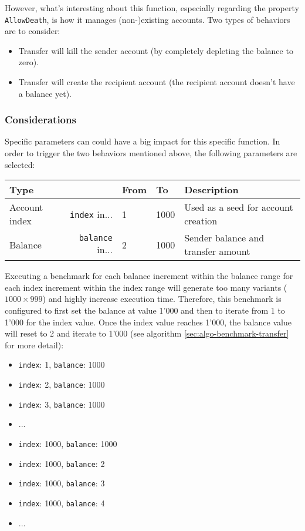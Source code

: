 \documentclass[11pt,a4paper]{article}
\begin{document}
However, what's interesting about this function, especially regarding the
property \verb|AllowDeath|, is how it manages (non-)existing accounts. Two types
of behaviors are to consider:

\begin{itemize}
  \item Transfer will kill the sender account (by completely depleting the
  balance to zero).
  \item Transfer will create the recipient account (the recipient account
  doesn't have a balance yet).
\end{itemize}

\subsubsection*{Considerations}

Specific parameters can could have a big impact for this specific function. In
order to trigger the two behaviors mentioned above, the following parameters are
selected:

\begin{center}
  \begin{tabular}{ l|r l l l }
    \textbf{Type} && \textbf{From} & \textbf{To} & \textbf{Description}\\
    \hline
    Account index & \verb|index| in... & 1 & 1000 & Used as a seed for account
    creation \\
    Balance & \verb|balance| in... & 2 & 1000 & Sender balance and transfer
    amount \\
  \end{tabular}
\end{center}

Executing a benchmark for each balance increment within the balance range for
each index increment within the index range will generate too many variants
($1000 \times 999$) and highly increase execution time. Therefore, this
benchmark is configured to first set the balance at value 1'000 and then to
iterate from 1 to 1'000 for the index value. Once the index value reaches 1'000,
the balance value will reset to 2 and iterate to 1'000 (see algorithm
\ref{sec:algo-benchmark-transfer} for more detail):

\begin{itemize}
  \item \verb|index|: 1, \verb|balance|: 1000
  \item \verb|index|: 2, \verb|balance|: 1000
  \item \verb|index|: 3, \verb|balance|: 1000
  \item ...
  \item \verb|index|: 1000, \verb|balance|: 1000
  \item \verb|index|: 1000, \verb|balance|: 2
  \item \verb|index|: 1000, \verb|balance|: 3
  \item \verb|index|: 1000, \verb|balance|: 4
  \item ...
\end{itemize}
\end{document}
